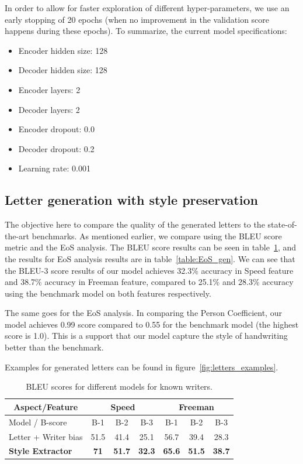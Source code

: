     \par In order to allow for faster exploration of different hyper-parameters, we use an early stopping of 20 epochs (when no improvement in the validation score happens during these epochs). To summarize, the current model specifications:
    \begin{itemize}
        \item Encoder hidden size: 128
        \item Decoder hidden size: 128
        \item Encoder layers: 2
        \item Decoder layers: 2
        \item Encoder dropout: 0.0
        \item Decoder dropout: 0.2
        \item Learning rate: 0.001
    \end{itemize}

  \subsection{Letter generation with style preservation}
  \par The objective here to compare the quality of the generated letters to the state-of-the-art benchmarks. As mentioned earlier, we compare using the BLEU score metric and the EoS analysis.
  The BLEU score results can be seen in table~\ref{table:bleu_gen}, and the results for EoS analysis results are in table~\ref{table:EoS_gen}. We can see that the BLEU-3 score results of our model achieves 32.3\% accuracy in Speed feature and 38.7\% accuracy in Freeman feature, compared to 25.1\% and 28.3\% accuracy using the benchmark model on both features respectively.
  \par The same goes for the EoS analysis. In comparing the Person Coefficient, our model achieves 0.99 score compared to 0.55 for the benchmark model (the highest score is 1.0). This is a support that our model capture the style of handwriting better than the benchmark.
  \par Examples for generated letters can be found in figure~\ref{fig:letters_examples}.


  \begin{table}[!htbp]
  \centering
  \begin{tabular}{l|c c c|c c c}
  \hline
  \multicolumn{1}{c|}{Aspect/Feature} & \multicolumn{3}{c|}{ Speed } & \multicolumn{3}{c}{ Freeman }   \\ \hline
  Model / B-score      & B-1  & B-2  & B-3           & B-1  & B-2   & B-3              \\ \hline
  Letter + Writer bias & 51.5 & 41.4 & 25.1          & 56.7 & 39.4  & 28.3             \\\hline
  \textbf{Style Extractor} & \textbf{71} & \textbf{51.7} & \textbf{32.3} & \textbf{65.6} & \textbf{51.5} & \textbf{38.7} \\\hline
  \end{tabular}
  \caption{BLEU scores for different models for known writers.}
  \label{table:bleu_gen}
  \end{table}

